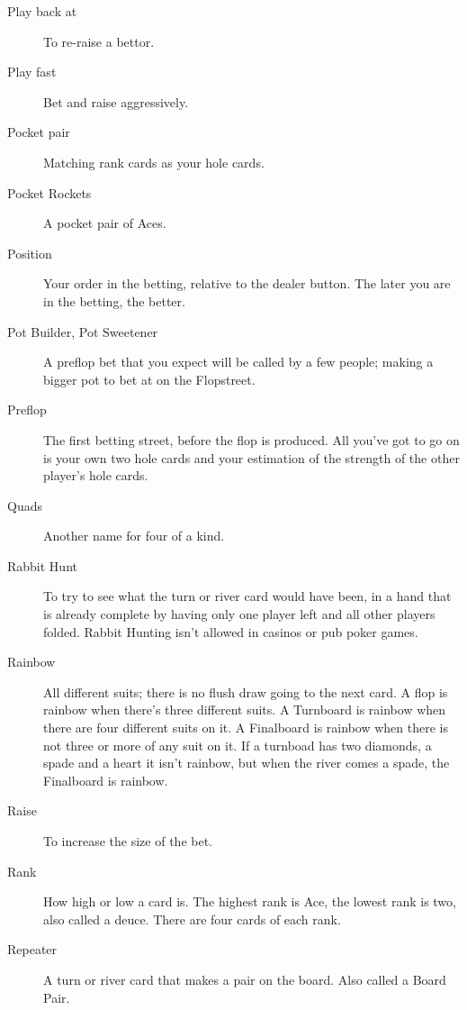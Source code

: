 \begin{description}
\item[Play back at] To re-raise a bettor.

\item[Play fast] Bet and raise aggressively.

\item[Pocket pair] Matching rank cards as your hole cards.

\item[Pocket Rockets] A pocket pair of Aces.

\item[Position] Your order in the betting, relative to the dealer
button. The later you are in the betting, the better.

\item[Pot Builder, Pot Sweetener] A preflop bet that you expect will
be called by a few people; making a bigger pot to bet at on the
Flopstreet.

\item[Preflop] The first betting street, before the flop is produced.
All you've got to go on is your own two hole cards and your estimation
of the strength of the other player's hole cards.

\item[Quads] Another name for four of a kind.

\item[Rabbit Hunt] To try to see what the turn or river card would
have been, in a hand that is already complete by having only one
player left and all other players folded. Rabbit Hunting isn't allowed
in casinos or pub poker games.

\item[Rainbow] All different suits; there is no flush
draw going to the next card. A flop is rainbow when there's three
different suits. A Turnboard is rainbow when there are four different
suits on it. A Finalboard is rainbow when there is not
three or more of any suit on it. If a turnboad has two diamonds, a
spade and a heart it isn't rainbow, but when the river comes a spade,
the Finalboard is rainbow.

\item[Raise] To increase the size of the bet.

\item[Rank] How high or low a card is. The highest rank is Ace, the
lowest rank is two, also called a deuce. There are four cards of
each rank.

\item[Repeater] A turn or river card that makes a pair on the
board. Also called a Board Pair.


\end{description}
